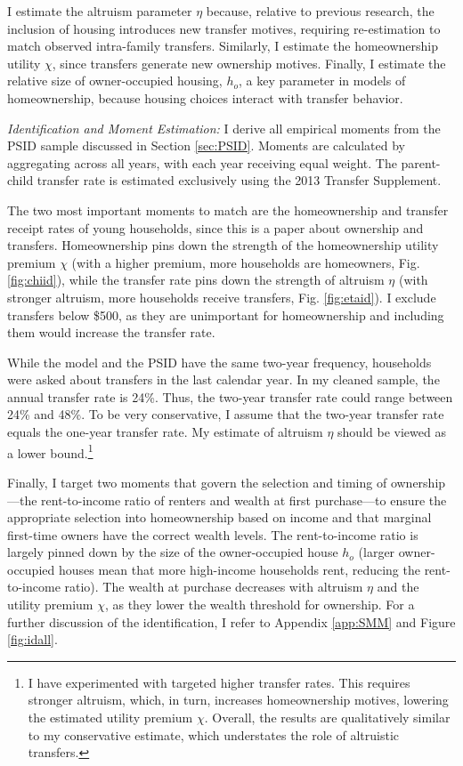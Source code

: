 \documentclass[12pt]{article}
\begin{document}
I estimate the altruism parameter $\eta$ because, relative to previous research, the inclusion of housing introduces new transfer motives, requiring re-estimation to match observed intra-family transfers. Similarly, I estimate the homeownership utility $\chi$, since transfers generate new ownership motives. Finally, I estimate the relative size of owner-occupied housing, $h_o$, a key parameter in models of homeownership, because housing choices interact with transfer behavior.

\textit{Identification and Moment Estimation:}
I derive all empirical moments from the PSID sample discussed in Section \ref{sec:PSID}. Moments are calculated by aggregating across all years, with each year receiving equal weight. The parent-child transfer rate is estimated exclusively using the 2013 Transfer Supplement.

The two most important moments to match are the homeownership and transfer receipt rates of young households, since this is a paper about ownership and transfers. Homeownership pins down the strength of the homeownership utility premium $\chi$ (with a higher premium, more households are homeowners, Fig. \ref{fig:chiid}), while the transfer rate pins down the strength of altruism $\eta$ (with stronger altruism, more households receive transfers, Fig. \ref{fig:etaid}). I exclude transfers below \$500, as they are unimportant for homeownership and including them would increase the transfer rate.

While the model and the PSID have the same two-year frequency, households were asked about transfers in the last calendar year. In my cleaned sample, the annual transfer rate is 24\%. Thus, the two-year transfer rate could range between 24\% and 48\%. To be very conservative, I assume that the two-year transfer rate equals the one-year transfer rate. My estimate of altruism $\eta$ should be viewed as a lower bound.\footnote{I have experimented with targeted higher transfer rates. This requires stronger altruism, which, in turn, increases homeownership motives, lowering the estimated utility premium $\chi$. Overall, the results are qualitatively similar to my conservative estimate, which understates the role of altruistic transfers.}

Finally, I target two moments that govern the selection and timing of ownership---the rent-to-income ratio of renters and wealth at first purchase---to ensure the appropriate selection into homeownership based on income and that marginal first-time owners have the correct wealth levels. The rent-to-income ratio is largely pinned down by the size of the owner-occupied house $h_o$ (larger owner-occupied houses mean that more high-income households rent, reducing the rent-to-income ratio). The wealth at purchase decreases with altruism $\eta$ and the utility premium $\chi$, as they lower the wealth threshold for ownership. For a further discussion of the identification, I refer to Appendix \ref{app:SMM} and Figure \ref{fig:idall}.
\end{document}
